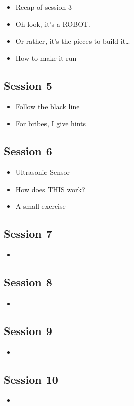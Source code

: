 \documentclass{article}
\begin{document}
\begin{itemize}
  \item Recap of session 3
  \item Oh look, it's a ROBOT.
  \item Or rather, it's the pieces to build it\ldots
  \item How to make it run
\end{itemize}

\subsection{Session 5}

\begin{itemize}
  \item Follow the black line
  \item For bribes, I give hints
\end{itemize}

\subsection{Session 6}

\begin{itemize}
  \item Ultrasonic Sensor
  \item How does THIS work?
  \item A small exercise
\end{itemize}

\subsection{Session 7}

\begin{itemize}
  \item 
\end{itemize}

\subsection{Session 8}

\begin{itemize}
  \item 
\end{itemize}

\subsection{Session 9}

\begin{itemize}
  \item 
\end{itemize}

\subsection{Session 10}

\begin{itemize}
  \item 
\end{itemize}
\end{document}

